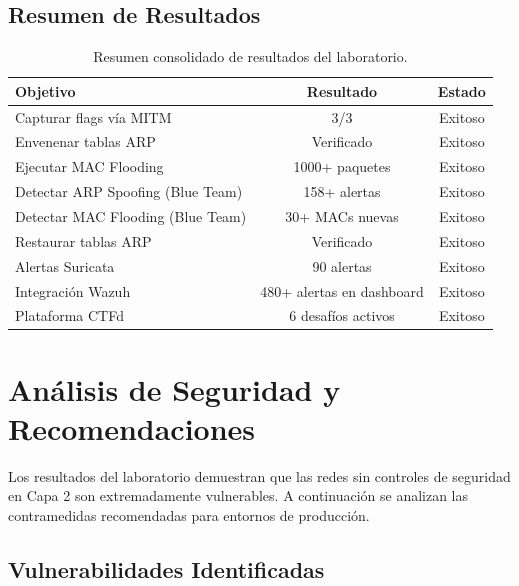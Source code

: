\documentclass[12pt, a4paper]{article}
\begin{document}
\subsection{Resumen de Resultados}

\begin{table}[H]
    \centering
    \caption{Resumen consolidado de resultados del laboratorio.}
    \label{tab:summary-results}
    \begin{tabularx}{\textwidth}{|X|c|c|}
        \hline
        \textbf{Objetivo} & \textbf{Resultado} & \textbf{Estado} \\
        \hline\hline
        Capturar flags v\'ia MITM & 3/3 & Exitoso \\
        \hline
        Envenenar tablas ARP & Verificado & Exitoso \\
        \hline
        Ejecutar MAC Flooding & 1000+ paquetes & Exitoso \\
        \hline
        Detectar ARP Spoofing (Blue Team) & 158+ alertas & Exitoso \\
        \hline
        Detectar MAC Flooding (Blue Team) & 30+ MACs nuevas & Exitoso \\
        \hline
        Restaurar tablas ARP & Verificado & Exitoso \\
        \hline
        Alertas Suricata & 90 alertas & Exitoso \\
        \hline
        Integraci\'on Wazuh & 480+ alertas en dashboard & Exitoso \\
        \hline
        Plataforma CTFd & 6 desaf\'ios activos & Exitoso \\
        \hline
    \end{tabularx}
\end{table}

\newpage

\section{An\'alisis de Seguridad y Recomendaciones}

Los resultados del laboratorio demuestran que las redes sin controles de seguridad en Capa 2 son extremadamente vulnerables. A continuaci\'on se analizan las contramedidas recomendadas para entornos de producci\'on.

\subsection{Vulnerabilidades Identificadas}
\end{document}
